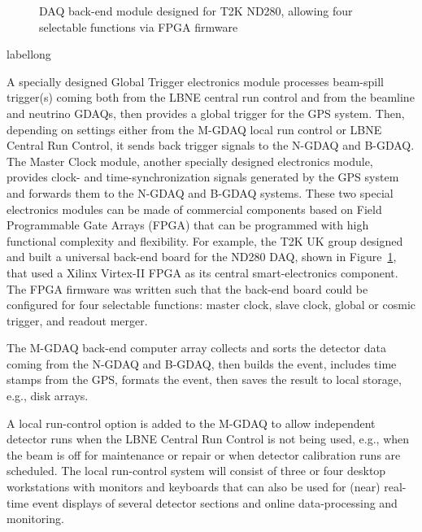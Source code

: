 \begin{figure}[htp]
\begin{center}
\caption[DAQ back-end module designed for T2K ND280]{\label{fig:T2KBEB} DAQ back-end module designed for T2K ND280, allowing four selectable functions via FPGA firmware %
}
\end{center}
\end{figure}
\begin{cdrfigure}[short]{label}{long}
\end{cdrfigure}
A specially designed Global Trigger electronics module processes 
beam-spill trigger(s) coming 
both from the LBNE central run control and from the beamline and neutrino GDAQs,
then provides a global trigger for 
the GPS system. 
Then, 
depending on settings either from the M-GDAQ local run control or LBNE 
Central Run Control, it sends back trigger signals to the N-GDAQ and B-GDAQ.  
The Master Clock module, another specially 
designed electronics module, provides clock- and time-synchronization 
signals generated by the GPS system and forwards them to the N-GDAQ and 
B-GDAQ systems.  These two special electronics modules can be made of 
commercial components based on Field Programmable Gate Arrays (FPGA) 
that can be programmed with high functional complexity and flexibility. 
For example, the T2K UK group designed and built a universal back-end board for 
the ND280 DAQ, shown in Figure~\ref{fig:T2KBEB}, that used a Xilinx Virtex-II 
FPGA as its central smart-electronics component. The FPGA firmware was 
written such that the back-end board could be configured for four 
selectable functions: master clock, slave clock, global or cosmic 
trigger, and readout merger.

The M-GDAQ back-end computer array collects and sorts the detector data 
coming from the N-GDAQ and B-GDAQ, then builds the event, includes 
time stamps from the GPS, formats the event, then %
saves the 
result to local storage, e.g., disk arrays.

A local run-control option is added to the M-GDAQ %
to allow independent 
detector runs when the LBNE Central Run Control is not being used, e.g.,  
when the beam is off for maintenance or repair or when detector 
calibration runs are scheduled. The local run-control system will consist of three or four 
desktop workstations with monitors and keyboards that can also be used 
for (near) real-time event displays of several detector sections and 
online data-processing and monitoring.

